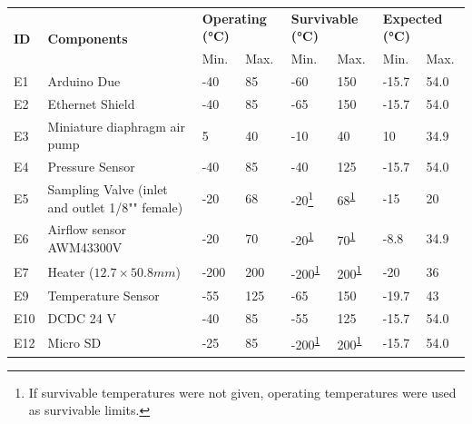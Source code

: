 \documentclass[a4paper,12pt,oneside]{article}
\begin{document}
\begin{longtable}{|m{1cm}|m{3.5cm}|m{1.3cm}|m{1.3cm}|m{1.4cm}|m{1.3cm}|m{1.3cm}|m{1.3cm}|}
\hline
\multirow{2}{*}{\textbf{ID}} & \multirow{2}{*}{\textbf{Components}}                                 & \multicolumn{2}{l|}{\textbf{Operating (°C)}} & \multicolumn{2}{l|}{\textbf{Survivable (°C)}} & \multicolumn{2}{l|}{\textbf{Expected (°C)}} \\ \cline{3-8} &   & Min.  & Max.  & Min.  & Max.  &  Min.   &  Max.            \\ \hline
E1 & Arduino Due & -40 & 85 & -60 & 150 & -15.7 & 54.0 \\ \hline
E2 & Ethernet Shield & -40 & 85 & -65 & 150 & -15.7 & 54.0 \\ \hline
E3 & Miniature diaphragm air pump & 5 & 40 & -10 & 40 & 10 & 34.9 \\ \hline
E4 & Pressure Sensor & -40 & 85 & -40 & 125 & -15.7 & 54.0 \\ \hline
E5 & Sampling Valve (inlet and outlet 1/8"" female) & -20 & 68 & -20\footnote{If survivable temperatures were not given, operating temperatures were used as survivable limits.\label{fn:erik}} & 68\textsuperscript{\ref{fn:erik}} & -15 & 20 \\ \hline
E6 & Airflow sensor AWM43300V & -20 & 70 & -20\textsuperscript{\ref{fn:erik}} & 70\textsuperscript{\ref{fn:erik}} & -8.8 & 34.9 \\ \hline
E7 & Heater ($12.7\times 50.8 mm$) & -200 & 200 & -200\textsuperscript{\ref{fn:erik}} & 200\textsuperscript{\ref{fn:erik}} & -20 & 36 \\ \hline
E9 & Temperature Sensor & -55 & 125 & -65 & 150 & -19.7 & 43 \\ \hline
E10 & DCDC 24 V & -40 & 85 & -55 & 125 & -15.7 & 54.0 \\ \hline
E12 & Micro SD & -25 & 85 & -200\textsuperscript{\ref{fn:erik}} & 200\textsuperscript{\ref{fn:erik}} & -15.7 & 54.0 \\ \hline

\end{longtable}
\end{document}
